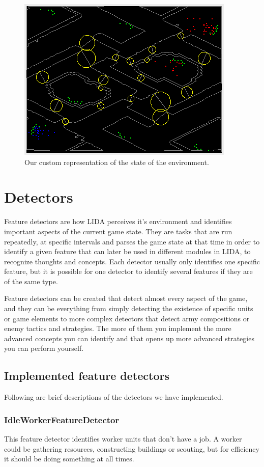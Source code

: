 \begin{figure}[h!tb]
\centering
\includegraphics{graphics/environment-gui.png}
\caption{Our custom representation of the state of the environment.}
\label{fig:environment-gui}
\end{figure}

\section{Detectors}
\label{sec:detectors}
Feature detectors are how LIDA perceives it's environment and identifies important aspects of the current game state. They are tasks that are run repeatedly, at specific intervals and parses the game state at that time in order to identify a given feature that can later be used in different modules in LIDA, to recognize thoughts and concepts. Each detector usually only identifies one specific feature, but it is possible for one detector to identify several features if they are of the same type.

Feature detectors can be created that detect almost every aspect of the game, and they can be everything from simply detecting the existence of specific units or game elements to more complex detectors that detect army compositions or enemy tactics and strategies. The more of them you implement the more advanced concepts you can identify and that opens up more advanced strategies you can perform yourself.

\subsection{Implemented feature detectors}
Following are brief descriptions of the detectors we have implemented.

\subsubsection{IdleWorkerFeatureDetector}
This feature detector identifies worker units that don't have a job. A worker could be gathering resources, constructing buildings or scouting, but for efficiency it should be doing something at all times.

